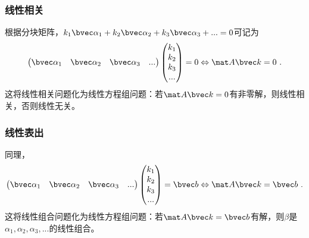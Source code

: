 \subsubsection{线性相关}
根据分块矩阵，$k_1 \bvec \alpha_1+k_2 \bvec \alpha_2+k_3 \bvec \alpha_3+...=0$可记为
$$
\begin{pmatrix}
\bvec \alpha_1& \bvec \alpha_2& \bvec \alpha_3&...
\end{pmatrix}
\begin{pmatrix}
k_{1}\\
k_{2}\\
k_{3}\\
...\\
\end{pmatrix}
=
0
\Leftrightarrow 
\mat A \bvec k = 0~.
$$
这将线性相关问题化为线性方程组问题：若$\mat A \bvec k = 0$有非零解，则线性相关，否则线性无关。

\subsubsection{线性表出}
同理，
$$
\begin{pmatrix}
\bvec \alpha_1& \bvec \alpha_2& \bvec \alpha_3&...
\end{pmatrix}
\begin{pmatrix}
k_{1}\\
k_{2}\\
k_{3}\\
...\\
\end{pmatrix}
=
\bvec b
\Leftrightarrow 
\mat A \bvec k = \bvec b~.
$$
这将线性组合问题化为线性方程组问题：若$\mat A \bvec k = \bvec b$有解，则$\beta$是$\alpha_1, \alpha_2,\alpha_3,...$的线性组合。
